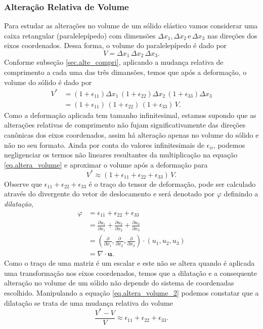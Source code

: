 \subsubsection{Altera\c{c}\~ao Relativa de Volume}

Para estudar as altera\c{c}\~oes no volume de um s\'olido el\'astico vamos considerar uma caixa retangular (paralelep\'ipedo) com dimens\~oes $\Delta x_1, \Delta x_2\,\text{e}\,\Delta x_3$ nas dire\c{c}\~oes dos eixos coordenados.  Dessa forma, o volume do paralelep\'ipedo \'e dado por\begin{equation*}
V=\Delta x_1\,\Delta x_2\,\Delta x_3.
\end{equation*}
Conforme subse\c{c}\~ao \ref{sec.alte_compri}, aplicando a mudan\c{c}a relativa de comprimento a cada uma das tr\^es dimans\~oes, temos que ap\'os a deforma\c{c}\~ao, o volume do s\'olido \'e dado por
\begin{align}\nonumber
V^*&=(1+\epsilon_{11})\Delta x_1\,(1+\epsilon_{22})\Delta x_2\,(1+\epsilon_{33})\Delta x_3\\\label{eq.altera_volume}
&=(1+\epsilon_{11})\,(1+\epsilon_{22})\,(1+\epsilon_{33})\,V.
\end{align}
Como a deforma\c{c}\~ao aplicada tem tamanho infinitesimal, estamos supondo que as altera\c{c}\~oes relativas de comprimento n\~ao fujam significativamente das dire\c{c}\~oes can\^onicas dos eixos coordenados, assim h\'a altera\c{c}\~ao apenas no volume do s\'olido e n\~ao no seu formato. Ainda por conta do valores infinitesimais de $\epsilon_{ii}$, podemos negligenciar os termos n\~ao lineares resultantes da multiplica\c{c}\~ao na equa\c{c}\~ao \ref{eq.altera_volume} e aproximar o volume ap\'os a deforma\c{c}\~ao para
\begin{equation}\label{eq.altera_volume_2}
V^*\approx(1+\epsilon_{11}+\epsilon_{22}+\epsilon_{33})\,V.
\end{equation}
Observe que $\epsilon_{11}+\epsilon_{22}+\epsilon_{33}$ \'e o tra\c{c}o do tensor de deforma\c{c}\~ao, pode ser calculado atrav\'es do divergente do vetor de deslocamento e ser\'a denotado por $\varphi$ definindo a \textit{dilata\c{c}\~ao},
\begin{align*}
\varphi &=\epsilon_{11}+\epsilon_{22}+\epsilon_{33}\\
&=\frac{\partial u_1}{\partial x_1}+\frac{\partial u_2}{\partial x_2}+\frac{\partial u_3}{\partial x_3}\\
&=\left(\frac{\partial}{\partial x_1},\frac{\partial}{\partial x_2},\frac{\partial}{\partial x_3}\right)\cdot(u_1,u_2,u_3)\\
&=\nabla\cdot \mathbf{u}.
\end{align*}
Como o tra\c{c}o de uma matriz \'e um escalar e este n\~ao se altera quando \'e aplicada uma transforma\c{c}\~ao nos eixos coordenados, temos que a dilata\c{c}\~ao e a consequente altera\c{c}\~ao no volume de um s\'olido n\~ao depende do sistema de coordenadas escolhido. Manipulando a equa\c{c}\~ao \ref{eq.altera_volume_2} podemos constatar que a dilata\c{c}\~ao se trata de uma mudan\c{c}a relativa do volume
\begin{equation*}
\frac{V^*-V}{V}\approx\epsilon_{11}+\epsilon_{22}+\epsilon_{33}.
\end{equation*}

